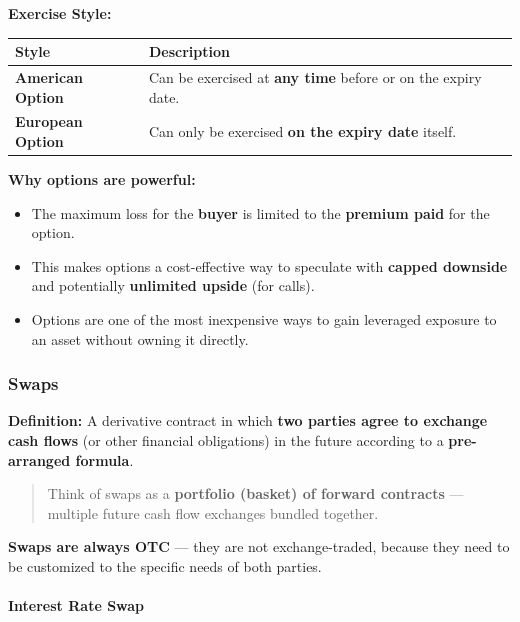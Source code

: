 \documentclass[12pt,openany]{book}
\begin{document}
\textbf{Exercise Style:}

\begin{center}
\small
\renewcommand{\arraystretch}{1.2}
\begin{tabular}{|L{0.26\textwidth}|L{0.64\textwidth}|}
\hline
\textbf{Style} & \textbf{Description} \\ \hline
\textbf{American Option} & Can be exercised at \textbf{any time} before or on the expiry date. \\ \hline
\textbf{European Option} & Can only be exercised \textbf{on the expiry date} itself. \\ \hline
\end{tabular}
\end{center}

\textbf{Why options are powerful:}
\begin{itemize}[leftmargin=*]
    \item The maximum loss for the \textbf{buyer} is limited to the \textbf{premium paid} for the option.
    \item This makes options a cost-effective way to speculate with \textbf{capped downside} and potentially \textbf{unlimited upside} (for calls).
    \item Options are one of the most inexpensive ways to gain leveraged exposure to an asset without owning it directly.
\end{itemize}

\subsubsection{Swaps}

\textbf{Definition:} A derivative contract in which \textbf{two parties agree to exchange cash flows} (or other financial obligations) in the future according to a \textbf{pre-arranged formula}.

\begin{quote}
    Think of swaps as a \textbf{portfolio (basket) of forward contracts} --- multiple future cash flow exchanges bundled together.
\end{quote}

\textbf{Swaps are always OTC} --- they are not exchange-traded, because they need to be customized to the specific needs of both parties.

\paragraph{Interest Rate Swap}
\end{document}
